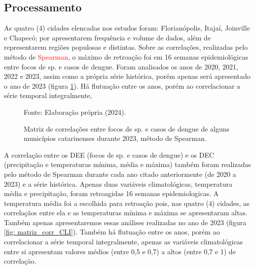 \documentclass[
	12pt,				%
	openright,			%
	oneside,			%
	a4paper,			%
	english,			%
	french,				%
	spanish,			%
	brazil				%
	dvipsnames, table]{abntex2}
\begin{document}
\subsection{Processamento}

\indent As quatro (4) cidades elencadas nos estudos foram: Florianópolis, Itajaí, Joinville e Chapecó; por apresentarem frequência e volume de dados, além de representarem regiões populosas e distintas. Sobre as correlações, realizadas pelo método de \textcolor{red}{Spearman}, o máximo de retroação foi em 16 semanas epidemiológicas entre focos de  sp. e casos de dengue. Foram analisados os anos de 2020, 2021, 2022 e 2023, assim como a própria série histórica, porém apenas será apresentado o ano de 2023 (figura \ref{fig: matriz_corr_DEE}).
Há flutuação entre os anos, porém ao correlacionar a série temporal integralmente, 

\begin{figure}[htbp]
    \centering
    \caption{Matriz de correlações entre focos de  sp. e casos de dengue de alguns municípios catarinenses durante 2023, método de Spearman.}
    \label{fig: matriz_corr_DEE}
    \hfill
    \hfill
    \small{Fonte: Elaboração própria (2024).}
\end{figure}

\indent A correlação entre os \acrshort{DEE} (focos de  sp. e casos de dengue) e os \acrshort{DEC} (precipitação e temperaturas mínima, média e máxima) também foram realizadas pelo método de Spearman durante cada ano citado anteriormente (de 2020 a 2023) e a série histórica. Apenas duas variáveis climatológicas, temperatura média e precipitação, foram retroagidas 16 semanas epidemiologicas. A temperatura média foi a escolhida para retroação pois, nas quatro (4) cidades, as correlaçãos entre ela e as temperaturas mínima e máxima se apresentaram altas. Também apenas apresentaremos essas análises realizadas no ano de 2023 (figura \ref{fig: matriz_corr_CLI}). Também há flutuação entre os anos, porém ao correlacionar a série temporal integralmente, apenas as variáveis climatológicas entre si apresentam valores médios (entre 0,5 e 0,7) a altos (entre 0,7 e 1) de correlação.
\end{document}

